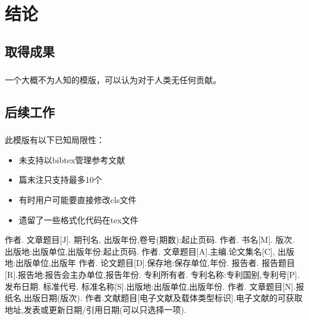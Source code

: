 ﻿\documentclass{sysuthesis}
\begin{document}
\chapter{结论}

\section{取得成果}

\paragraph{}一个大概不为人知的模版，可以认为对于人类无任何贡献。

\section{后续工作}

\paragraph{}此模版有以下已知局限性：

\begin{itemize}
\item 未支持以bibtex管理参考文献
\item 篇末注只支持最多10个
\item 有时用户可能要直接修改cls文件
\item 遗留了一些格式化代码在tex文件
\end{itemize}


\displayendnotes

\begin{thebibliography}{99}
\songti
 作者. 文章题目[J]. 期刊名, 出版年份,卷号(期数):起止页码.
 作者. 书名[M]. 版次. 出版地:出版单位,出版年份:起止页码.
 作者. 文章题目[A].主编.论文集名[C], 出版地:出版单位,出版年
 作者. 论文题目[D].保存地:保存单位,年份.
 报告者. 报告题目[R].报告地:报告会主办单位,报告年份.
 专利所有者. 专利名称:专利国别,专利号[P].发布日期.
 标准代号. 标准名称[S].出版地:出版单位,出版年份.
 作者. 文章题目[N].报纸名,出版日期(版次).
 作者.文献题目[电子文献及载体类型标识].电子文献的可获取地址,发表或更新日期/引用日期(可以只选择一项).
\end{thebibliography}
\end{document}
